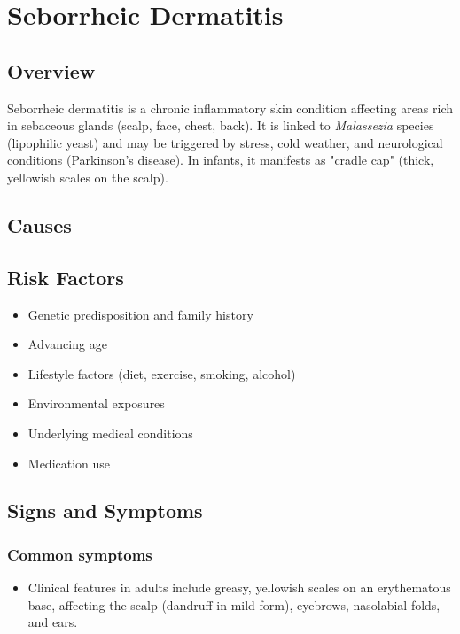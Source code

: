 \chapter{Seborrheic Dermatitis}
\label{sec:Seborrheic Dermatitis}

\section{Overview}
Seborrheic dermatitis is a chronic inflammatory skin condition affecting areas rich in sebaceous glands (scalp, face, chest, back). It is linked to \textit{Malassezia} species (lipophilic yeast) and may be triggered by stress, cold weather, and neurological conditions (Parkinson's disease). In infants, it manifests as "cradle cap" (thick, yellowish scales on the scalp).
\section{Causes}
\section{Risk Factors}

\begin{itemize}[noitemsep]
  \item Genetic predisposition and family history
  \item Advancing age
  \item Lifestyle factors (diet, exercise, smoking, alcohol)
  \item Environmental exposures
  \item Underlying medical conditions
  \item Medication use
\end{itemize}
\section{Signs and Symptoms}

\subsection{Common symptoms}
\begin{itemize}[noitemsep]
  \item Clinical features in adults include greasy, yellowish scales on an erythematous base, affecting the scalp (dandruff in mild form), eyebrows, nasolabial folds, and ears. 
  \end{itemize}

